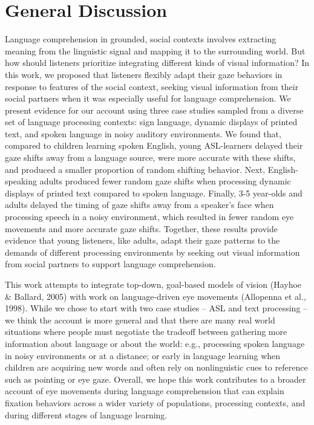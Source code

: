 \documentclass[english,floatsintext,man]{apa6}
\begin{document}
\hypertarget{general-discussion}{%
\section{General Discussion}\label{general-discussion}}

Language comprehension in grounded, social contexts involves extracting
meaning from the linguistic signal and mapping it to the surrounding
world. But how should listeners prioritize integrating different kinds
of visual information? In this work, we proposed that listeners flexibly
adapt their gaze behaviors in response to features of the social
context, seeking visual information from their social partners when it
was especially useful for language comprehension. We present evidence
for our account using three case studies sampled from a diverse set of
language processing contexts: sign language, dynamic displays of printed
text, and spoken language in noisy auditory environments. We found that,
compared to children learning spoken English, young ASL-learners delayed
their gaze shifts away from a language source, were more accurate with
these shifts, and produced a smaller proportion of random shifting
behavior. Next, English-speaking adults produced fewer random gaze
shifts when processing dynamic displays of printed text compared to
spoken language. Finally, 3-5 year-olds and adults delayed the timing of
gaze shifts away from a speaker's face when processing speech in a noisy
environment, which resulted in fewer random eye movements and more
accurate gaze shifts. Together, these results provide evidence that
young listeners, like adults, adapt their gaze patterns to the demands
of different processing environments by seeking out visual information
from social partners to support language comprehension.

This work attempts to integrate top-down, goal-based models of vision
(Hayhoe \& Ballard, 2005) with work on language-driven eye movements
(Allopenna et al., 1998). While we chose to start with two case studies
-- ASL and text processing -- we think the account is more general and
that there are many real world situations where people must negotiate
the tradeoff between gathering more information about language or about
the world: e.g., processing spoken language in noisy environments or at
a distance; or early in language learning when children are acquiring
new words and often rely on nonlinguistic cues to reference such as
pointing or eye gaze. Overall, we hope this work contributes to a
broader account of eye movements during language comprehension that can
explain fixation behaviors across a wider variety of populations,
processing contexts, and during different stages of language learning.
\end{document}
